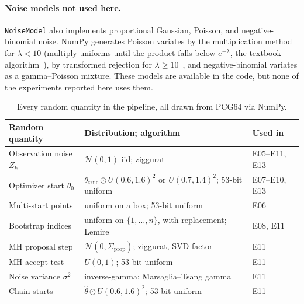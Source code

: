 \paragraph{Noise models not used here.} \texttt{NoiseModel} also implements proportional
Gaussian, Poisson, and negative-binomial noise. NumPy generates Poisson variates by the
multiplication method for $\lambda < 10$ (multiply uniforms until the product falls below
$e^{-\lambda}$, the textbook algorithm~\cite{banks2010}), by transformed rejection for
$\lambda \ge 10$~\cite{hormann1993}, and negative-binomial variates as a gamma--Poisson mixture.
These models are available in the code, but none of the experiments reported here uses them.

\begin{table}[t]
  \centering
  \footnotesize
  \caption{Every random quantity in the pipeline, all drawn from PCG64 via NumPy.}
  \label{tab:rng}
  \begin{tabularx}{\columnwidth}{@{}>{\raggedright\arraybackslash}p{2.05cm}
      >{\raggedright\arraybackslash}X >{\raggedright\arraybackslash}p{1.35cm}@{}}
    \toprule
    Random quantity & Distribution; algorithm & Used in \\
    \midrule
    Observation noise $Z_k$ & $\mathcal{N}(0,1)$ iid; ziggurat & E05--E11, E13 \\
    Optimizer start $\theta_0$ & $\theta_{\mathrm{true}} \odot U(0.6,1.6)^2$ or $U(0.7,1.4)^2$;
      53-bit uniform & E07--E10, E13 \\
    Multi-start points & uniform on a box; 53-bit uniform & E06 \\
    Bootstrap indices & uniform on $\{1,\dots,n\}$, with replacement; Lemire & E08, E11 \\
    MH proposal step & $\mathcal{N}(0,\Sigma_{\mathrm{prop}})$; ziggurat, SVD factor & E11 \\
    MH accept test & $U(0,1)$; 53-bit uniform & E11 \\
    Noise variance $\sigma^2$ & inverse-gamma; Marsaglia--Tsang gamma & E11 \\
    Chain starts & $\hat\theta \odot U(0.6,1.6)^2$; 53-bit uniform & E11 \\
    \bottomrule
  \end{tabularx}
\end{table}
